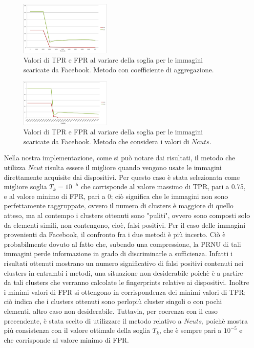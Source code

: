 \begin{figure}[h]
\begin{center}
\includegraphics[width=0.4\textwidth]{images/soglia_imgnat_fb_AC.png}
\end{center}
  \caption{Valori di TPR e FPR al variare della soglia per le immagini scaricate da Facebook. Metodo con coefficiente di aggregazione.}
\label{fig:soglia AC}
\end{figure}

\begin{figure}[h]
\begin{center}
\includegraphics[width=0.4\textwidth]{images/soglia_imgnat_fb_NC.png}
\end{center}
  \caption{Valori di TPR e FPR al variare della soglia per le immagini scaricate da Facebook. Metodo che considera i valori di $Ncuts$.}
\label{fig:soglia AC}
\end{figure}

Nella nostra implementazione, come si può notare dai risultati, il metodo che utilizza $Ncut$ risulta essere il migliore quando vengono usate le immagini direttamente acquisite dai dispositivi. Per questo caso è stata selezionata come migliore soglia $T_{k} = 10^{-5}$ che corrisponde al valore massimo di TPR, pari a 0.75, e al valore minimo di FPR, pari a 0; ciò significa che le immagini non sono perfettamente raggruppate, ovvero il numero di clusters è maggiore di quello atteso, ma al contempo i clusters ottenuti sono "puliti", ovvero sono composti solo da elementi simili, non contengono, cioè, falsi positivi.
Per il caso delle immagini provenienti da Facebook, il confronto fra i due metodi è più incerto. Ciò è probabilmente dovuto al fatto che, subendo una compressione, la PRNU di tali immagini perde informazione in grado di discriminarle a sufficienza. Infatti i risultati ottenuti mostrano un numero significativo di falsi positivi contenuti nei clusters in entrambi i metodi, una situazione non desiderabile poichè è a partire da tali clusters che verranno calcolate le fingerprints relative ai dispositivi. Inoltre i minimi valori di FPR si ottengono in corrispondenza dei minimi valori di TPR; ciò indica che i clusters ottenuti sono perlopiù cluster singoli o con pochi elementi, altro caso non desiderabile. Tuttavia, per coerenza con il caso precendente, è stata scelto di utilizzare il metodo relativo a $Ncuts$, poichè mostra più consistenza con il valore ottimale della soglia $T_{k}$, che è sempre pari a $10^{-5}$ e che corrisponde al valore minimo di FPR.

